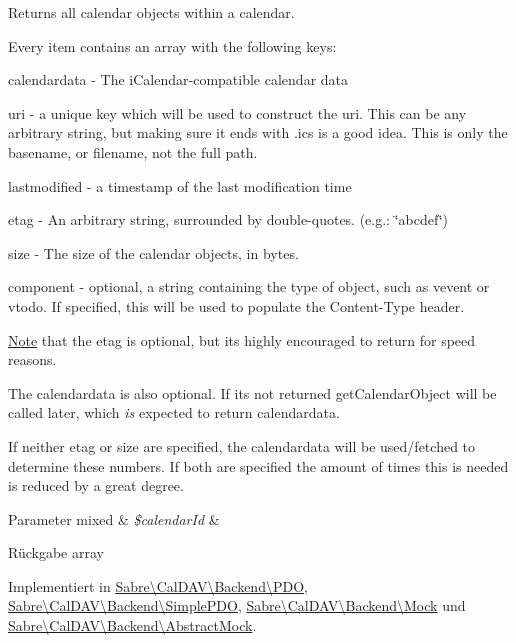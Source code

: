Returns all calendar objects within a calendar.

Every item contains an array with the following keys\+:
\begin{DoxyItemize}
\item calendardata -\/ The i\+Calendar-\/compatible calendar data
\item uri -\/ a unique key which will be used to construct the uri. This can be any arbitrary string, but making sure it ends with \textquotesingle{}.ics\textquotesingle{} is a good idea. This is only the basename, or filename, not the full path.
\item lastmodified -\/ a timestamp of the last modification time
\item etag -\/ An arbitrary string, surrounded by double-\/quotes. (e.\+g.\+: \textquotesingle{}\char`\"{}abcdef\char`\"{}\textquotesingle{})
\item size -\/ The size of the calendar objects, in bytes.
\item component -\/ optional, a string containing the type of object, such as \textquotesingle{}vevent\textquotesingle{} or \textquotesingle{}vtodo\textquotesingle{}. If specified, this will be used to populate the Content-\/\+Type header.
\end{DoxyItemize}

\mbox{\hyperlink{class_note}{Note}} that the etag is optional, but it\textquotesingle{}s highly encouraged to return for speed reasons.

The calendardata is also optional. If it\textquotesingle{}s not returned \textquotesingle{}get\+Calendar\+Object\textquotesingle{} will be called later, which {\itshape is} expected to return calendardata.

If neither etag or size are specified, the calendardata will be used/fetched to determine these numbers. If both are specified the amount of times this is needed is reduced by a great degree.


\begin{DoxyParams}[1]{Parameter}
mixed & {\em \$calendar\+Id} & \\
\hline
\end{DoxyParams}
\begin{DoxyReturn}{Rückgabe}
array 
\end{DoxyReturn}


Implementiert in \mbox{\hyperlink{class_sabre_1_1_cal_d_a_v_1_1_backend_1_1_p_d_o_a0f86121bbca86e632dd9d2b1ca14abaa}{Sabre\textbackslash{}\+Cal\+D\+A\+V\textbackslash{}\+Backend\textbackslash{}\+P\+DO}}, \mbox{\hyperlink{class_sabre_1_1_cal_d_a_v_1_1_backend_1_1_simple_p_d_o_a11bae2bb246b02189eb896efbf3a1454}{Sabre\textbackslash{}\+Cal\+D\+A\+V\textbackslash{}\+Backend\textbackslash{}\+Simple\+P\+DO}}, \mbox{\hyperlink{class_sabre_1_1_cal_d_a_v_1_1_backend_1_1_mock_a07387ba01145903a1214b2b3c4b3131e}{Sabre\textbackslash{}\+Cal\+D\+A\+V\textbackslash{}\+Backend\textbackslash{}\+Mock}} und \mbox{\hyperlink{class_sabre_1_1_cal_d_a_v_1_1_backend_1_1_abstract_mock_aa0031bf1754b41a98eeb26d987138a18}{Sabre\textbackslash{}\+Cal\+D\+A\+V\textbackslash{}\+Backend\textbackslash{}\+Abstract\+Mock}}.

